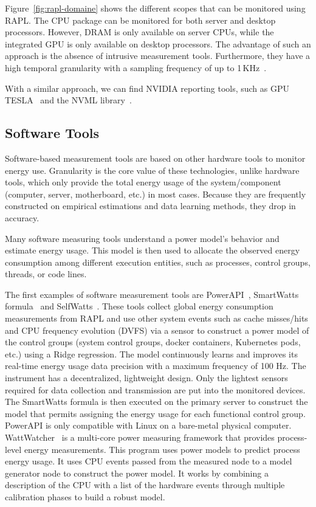 Figure~\ref{fig:rapl-domaine} shows the different scopes that can be monitored using RAPL.
The CPU package can be monitored for both server and desktop processors. However, DRAM is only available on server CPUs, while the integrated GPU is only available on desktop processors.
The advantage of such an approach is the absence of intrusive measurement tools.
Furthermore, they have a high temporal granularity with a sampling frequency of up to 1\,KHz~\cite{ilsche_power_2015}.

With a similar approach, we can find NVIDIA reporting tools, such as GPU TESLA~\cite{burtscher2014measuring} and the NVML library~\cite{fahad2019comparative}.

\subsection{Software Tools}
Software-based measurement tools are based on other hardware tools to monitor energy use. Granularity is the core value of these technologies, unlike hardware tools, which only provide the total energy usage of the system/component (computer, server, motherboard, etc.) in most cases.
Because they are frequently constructed on empirical estimations and data learning methods, they drop in accuracy.

Many software measuring tools understand a power model's behavior and estimate energy usage.
This model is then used to allocate the observed energy consumption among different execution entities, such as processes, control groups, threads, or code lines.

The first examples of software measurement tools are PowerAPI~\cite{colmant2018next}, SmartWatts formula~\cite{fieni2020smartwatts} and SelfWatts~\cite{fieni2021selfwatts}.
These tools collect global energy consumption measurements from RAPL and use other system events such as cache misses/hits and CPU frequency evolution (DVFS) via a sensor to construct a power model of the control groups (system control groups, docker containers, Kubernetes pods, etc.) using a Ridge regression.
The model continuously learns and improves its real-time energy usage data precision with a maximum frequency of 100 Hz.
The instrument has a decentralized, lightweight design.
Only the lightest sensors required for data collection and transmission are put into the monitored devices.
The SmartWatts formula is then executed on the primary server to construct the model that permits assigning the energy usage for each functional control group.
PowerAPI is only compatible with Linux on a bare-metal physical computer.
\\
WattWatcher~\cite{lebeane2015watt} is a multi-core power measuring framework that provides process-level energy measurements.
This program uses power models to predict process energy usage. It uses CPU events passed from the measured node to a model generator node to construct the power model. It works by combining a description of the CPU with a list of the hardware events through multiple calibration phases to build a robust model.

